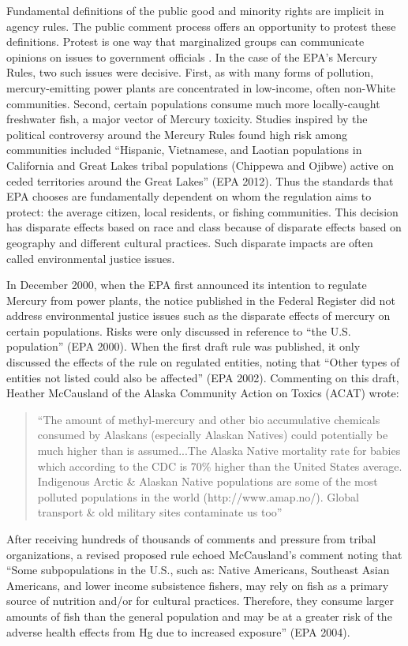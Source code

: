 Fundamental definitions of the public good and minority rights are implicit in agency rules. The public comment process offers an opportunity to protest these definitions. Protest is one way that  marginalized groups can communicate opinions on issues to government officials \citep{Gillion2015,Gillion2013}. In the case of the EPA's Mercury Rules, two such issues were decisive. First, as with many forms of pollution, mercury-emitting power plants are concentrated in low-income, often non-White communities. Second, certain populations consume much more locally-caught freshwater fish, a major vector of Mercury toxicity. Studies inspired by the political controversy around the Mercury Rules found high risk among communities included ``Hispanic, Vietnamese, and Laotian populations in California and Great Lakes tribal populations (Chippewa and Ojibwe) active on ceded territories around the Great Lakes'' (EPA 2012). Thus the standards that EPA chooses are fundamentally dependent on whom the regulation aims to protect: the average citizen, local residents, or fishing communities. This decision has disparate effects based on race and class because of disparate effects based on geography and different cultural practices. Such disparate impacts are often called environmental justice issues.

In December 2000, when the EPA first announced its intention to regulate Mercury from power plants, the notice published in the Federal Register did not address environmental justice issues such as the disparate effects of mercury on certain populations. Risks were only discussed in reference to ``the U.S. population'' (EPA 2000). When the first draft rule was published, it only discussed the effects of the rule on regulated entities, noting that ``Other types of entities not listed could also be affected'' (EPA 2002). Commenting on this draft, Heather McCausland of the Alaska Community Action on Toxics (ACAT) wrote:
\begin{quotation}
``The amount of methyl-mercury and other bio accumulative chemicals consumed by Alaskans (especially Alaskan Natives) could potentially be much higher than is assumed...The Alaska Native mortality rate for babies which according to the CDC is 70\% higher than the United States average. Indigenous Arctic \& Alaskan Native populations are some of the most polluted populations in the world (http://www.amap.no/). Global transport \& old military sites contaminate us too''
\end{quotation}

After receiving hundreds of thousands of comments and pressure from tribal organizations, a revised proposed rule echoed McCausland's comment noting that ``Some subpopulations in the U.S., such as: Native Americans, Southeast Asian Americans, and lower income subsistence fishers, may rely on fish as a primary source of nutrition and/or for cultural practices. Therefore, they consume larger amounts of fish than the general population and may be at a greater risk of the adverse health effects from Hg due to increased exposure'' (EPA 2004). 


